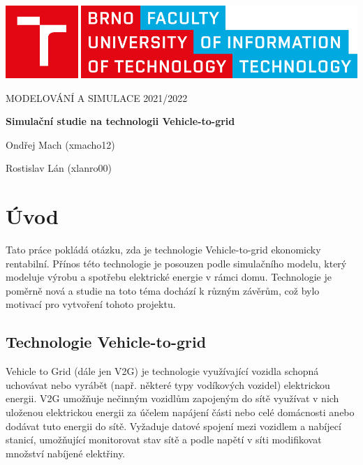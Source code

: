 \documentclass[12pt,a4paper]{article}
\begin{document}
\begin{titlepage}
\begin{center}
\includegraphics[width=0.5\linewidth]{img/logo.pdf}
\vspace{3cm}

\LARGE\uppercase{Modelování a simulace 2021/2022}
\vspace{1cm}

\LARGE\textbf{Simulační studie na technologii Vehicle-to-grid}

\vspace*{\fill}
\large{Ondřej Mach (xmacho12)}

\large{Rostislav Lán (xlanro00)}

\end{center}
\end{titlepage}


\setcounter{page}{1}
\tableofcontents
\clearpage


\section{Úvod}
Tato práce pokládá otázku, zda je technologie Vehicle-to-grid ekonomicky rentabilní.
Přínos této technologie je posouzen podle simulačního modelu, který modeluje výrobu a spotřebu elektrické energie v rámci domu.
Technologie je poměrně nová a studie na toto téma dochází k různým závěrům, což bylo motivací pro vytvoření tohoto projektu.

\subsection{Technologie Vehicle-to-grid}
Vehicle to Grid (dále jen V2G) je technologie využívající vozidla schopná uchovávat nebo vyrábět (např. některé typy vodíkových vozidel) elektrickou energii. V2G umožňuje nečinným vozidlům zapojeným do sítě využívat v nich uloženou elektrickou energii za účelem napájení části nebo celé domácnosti anebo dodávat tuto energii do sítě.
Vyžaduje datové spojení mezi vozidlem a nabíjecí stanicí, umožňující monitorovat stav sítě a podle napětí v síti modifikovat množství nabíjené elektřiny.
\end{document}

